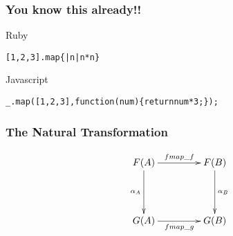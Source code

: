 \documentclass[12pt, xcolor=table]{beamer}
\begin{document}
\begin{comment}
Further examples

Maybe
-----
> data Maybe x = Just x | Nothing

> instance Functor Maybe where
>   fmap f (Just x) = Just (f x)
>   fmap f Nothing = Nothing


> fmap (++ "ho") (Just "hey")

Trees
-----
> data Tree x = Empty | Node x (Tree x) (Tree x)

> instance Functor Tree where
>   fmap f Empty = Empty
>   fmap f (Node x left right) = Node (f x) (fmap f left) (fmap f right)
\end{comment}

\begin{frame}
    \frametitle{You know this already!!}
    \begin{block}{Ruby}
        \begin{alltt}
            [1, 2, 3].map \{ |n| n * n \}
            % do I put the answers in the slides?
            % 2 slides for this instead of 1 --> with answers?
        \end{alltt}
    \end{block}
    \begin{block}{Javascript}
        \begin{alltt}
            \_.map([1, 2, 3], function(num)\{return num*3;\});
        \end{alltt}
    \end{block}
\end{frame}

\begin{frame}
    \frametitle{The Natural Transformation}
    \begin{equation*}
           \xymatrix@C+2em@R+2em{
              F(A) \ar[r]^{fmap\_f} \ar[d]_{\alpha_A} & F(B) \ar[d]^{\alpha_B} \\
              G(A) \ar[r]_{fmap\_g} & G(B)
             }
    \end{equation*}
%
%
%
%
\end{frame}
\end{document}
